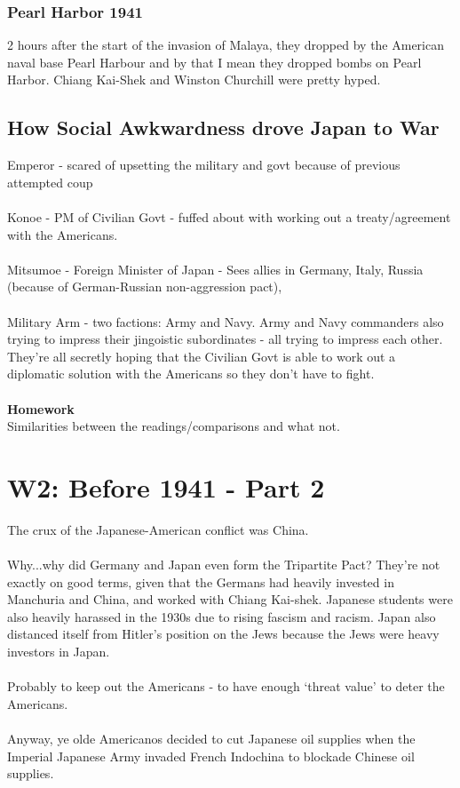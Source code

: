 \documentclass[a4paper]{article}
\begin{document}
\subsubsection{Pearl Harbor 1941}
2 hours after the start of the invasion of Malaya, they dropped by the American naval base Pearl Harbour and by that I mean they dropped bombs on Pearl Harbor. Chiang Kai-Shek and Winston Churchill were pretty hyped.
\subsection{How Social Awkwardness drove Japan to War}
Emperor - scared of upsetting the military and govt because of previous attempted coup\\
\\
Konoe - PM of Civilian Govt - fuffed about with working out a treaty/agreement with the Americans.\\
\\
Mitsumoe - Foreign Minister of Japan - Sees allies in Germany, Italy, Russia (because of German-Russian non-aggression pact),\\
\\
Military Arm - two factions: Army and Navy. Army and Navy commanders also trying to impress their jingoistic subordinates - all trying to impress each other. They're all secretly hoping that the Civilian Govt is able to work out a diplomatic solution with the Americans so they don't have to fight.\\
\\
\textbf{Homework}\\
Similarities between the readings/comparisons and what not.
\section{W2: Before 1941 - Part 2}
The crux of the Japanese-American conflict was China.\\
\\
Why...why did Germany and Japan even form the Tripartite Pact? They're not exactly on good terms, given that the Germans had heavily invested in Manchuria and China, and worked with Chiang Kai-shek. Japanese students were also heavily harassed in the 1930s due to rising fascism and racism. Japan also distanced itself from Hitler's position on the Jews because the Jews were heavy investors in Japan.\\
\\
Probably to keep out the Americans - to have enough `threat value' to deter the Americans.\\
\\
Anyway, ye olde Americanos decided to cut Japanese oil supplies when the Imperial Japanese Army invaded French Indochina to blockade Chinese oil supplies.
\end{document}
